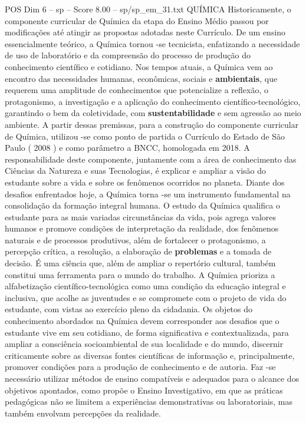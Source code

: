 \begin{textsample}{POS Dim 6 – sp – Score 8.00 – sp/sp\_em\_31.txt}  \label{ex:f6_pos_086}
QUÍMICA Historicamente, o componente curricular de Química da etapa do Ensino Médio passou por modificações até atingir as propostas adotadas neste Currículo.
De um ensino essencialmente teórico, a Química tornou -se tecnicista, enfatizando a necessidade de uso de laboratório e da compreensão do processo de produção do conhecimento científico e cotidiano.
Nos tempos atuais, a Química vem ao encontro das necessidades humanas, econômicas, sociais e \textbf{ambientais}, que requerem uma amplitude de conhecimentos que potencialize a reflexão, o protagonismo, a investigação e a aplicação do conhecimento científico-tecnológico, garantindo o bem da coletividade, com \textbf{sustentabilidade} e sem agressão ao meio ambiente.
A partir dessas premissas, para a construção do componente curricular de Química, utilizou -se como ponto de partida o Currículo do Estado de São Paulo ( 2008 ) e como parâmetro a BNCC, homologada em 2018.
A responsabilidade deste componente, juntamente com a área de conhecimento das Ciências da Natureza e suas Tecnologias, é explicar e ampliar a visão do estudante sobre a vida e sobre os fenômenos ocorridos no planeta.
Diante dos desafios enfrentados hoje, a Química torna -se um instrumento fundamental na consolidação da formação integral humana.
O estudo da Química qualifica o estudante para as mais variadas circunstâncias da vida, pois agrega valores humanos e promove condições de interpretação da realidade, dos fenômenos naturais e de processos produtivos, além de fortalecer o protagonismo, a percepção crítica, a resolução, a elaboração de \textbf{problemas} e a tomada de decisão.
É uma ciência que, além de ampliar o repertório cultural, também constitui uma ferramenta para o mundo do trabalho.
A Química prioriza a alfabetização científico-tecnológica como uma condição da educação integral e inclusiva, que acolhe as juventudes e se compromete com o projeto de vida do estudante, com vistas ao exercício pleno da cidadania.
Os objetos do conhecimento abordados na Química devem corresponder aos desafios que o estudante vive em seu cotidiano, de forma significativa e contextualizada, para ampliar a consciência socioambiental de sua localidade e do mundo, discernir criticamente sobre as diversas fontes científicas de informação e, principalmente, promover condições para a produção de conhecimento e de autoria.
Faz -se necessário utilizar métodos de ensino compatíveis e adequados para o alcance dos objetivos apontados, como propõe o Ensino Investigativo, em que as práticas pedagógicas não se limitem a experiências demonstrativas ou laboratoriais, mas também envolvam percepções da realidade.

\end{textsample}
